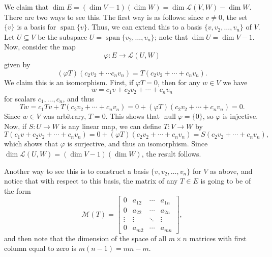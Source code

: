 \documentclass[12pt,letterpaper]{article}
\renewcommand{\L}{\mathcal{L}}
\newcommand{\M}{\mathcal{M}}
\DeclareMathOperator{\spn}{span}
\DeclareMathOperator{\nul}{null}
\begin{document}
We claim that $\dim E = (\dim V - 1)(\dim W) = \dim\L(V,W)-\dim W$. There are two ways to see this. The first way is as follows: since $v\neq 0$, the set $\{v\}$ is a basis for $\spn\{v\}$. Thus, we can extend this to a basis $\{v,v_2,\ldots, v_n\}$ of $V$. Let $U\subseteq V$ be the subspace $U=\spn\{v_2,\ldots, v_n\}$; note that $\dim U=\dim V-1$. Now, consider the map
\[
\varphi:E\to \L(U,W)
\]
given by 
\[
(\varphi T)(c_2v_2+\cdots c_nv_n) = T(c_2v_2+\cdots +c_nv_n).
\]
We claim this is an isomorphism. First, if $\varphi T = 0$, then for any $w\in V$ we have 
\[
w = c_1v+c_2v_2+\cdots+c_nv_n
\]
for scalars $c_1,\ldots, c_n$, and thus
\[
Tw = c_1Tv + T(c_2v_2+\cdots + c_nv_n) = 0 + (\varphi T)(c_2v_2+\cdots + c_nv_n) = 0.
\]
Since $w\in V$ was arbitrary, $T=0$. This shows that $\nul\varphi = \{0\}$, so $\varphi$ is injective. Now, if $S:U\to W$ is any linear map, we can define $T:V\to W$ by
\[
T(c_1v+c_2v_2+\cdots + c_nv_n) = 0 + (\varphi T)(c_2v_2+\cdots +c_nv_n) = S(c_2v_2+\cdots + c_nv_n),
\]
which shows that $\varphi$ is surjective, and thus an isomorphism. Since $\dim \L(U,W) = (\dim V-1)(\dim W)$, the result follows.

Another way to see this is to construct a basis $\{v,v_2,\ldots,v_n\}$ for $V$ as above, and notice that with respect to this basis, the matrix of any $T\in E$ is going to be of the form
\[
\M(T) = \begin{bmatrix}
0&a_{12}&\cdots &a_{1n}\\
0&a_{22}&\cdots &a_{2n}\\
\vdots &\vdots &\ddots &\vdots\\
0&a_{m2}&\cdots&a_{mn}
\end{bmatrix},
\]
and then note that the dimension of the space of all $m\times n$ matrices with first column equal to zero is $m(n-1) = mn-m$.
\end{document}
